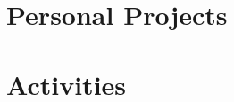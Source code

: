 \documentclass[]{deedy-resume-openfont-wjl}
\begin{document}
% 





%
%




%
%
\section{Personal Projects}

% 



% 

% 



%
%
% 

% 

%
%
\section{Activities}



% 





%
%





\end{document}
